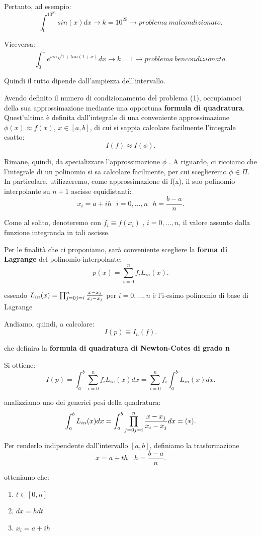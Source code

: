 \documentclass[11pt]{article}
\theoremstyle{definition}
\theoremstyle{plain}
\begin{document}
Pertanto, ad esempio:
\[
	\int_{0}^{10^{25}}sin(x)dx \to k=10^{25}\to problema\ malcondizionato
.\] 

Viceversa:
\[
	\int_{0}^{1}e^{sin\sqrt{1+tan(1+x)} }dx \to k=1\to problema\ bencondizionato
.\] 

Quindi il tutto dipende dall'ampiezza dell'intervallo.

Avendo definito il numero di condizionamento del problema (1), occupiamoci della sua approssimazione mediante una opportuna \textbf{formula di quadratura}.
Quest'ultima è definita dall'integrale di una conveniente approssimazione $\phi(x) \approx f(x)$, $x\in[a,b]$, di cui si sappia calcolare facilmente l'integrale esatto:
\[
	I(f)\approx I(\phi)
.\] 

Rimane, quindi, da specializzare l'approssimazione $\phi$ . A riguardo, ci ricoiamo che l'integrale di un polinomio si sa calcolare facilmente, per cui sceglieremo $\phi \in \Pi$. In particolare, utilizzeremo, come approssimazione di f(x), il suo polinomio interpolante su $n+1$ ascisse equidistanti:
\[
x_{i}=a+ih\ \ \ i=0,...,n\ \ \ h=\frac{b-a}{n}
.\] 

Come al solito, denoteremo con $f_{i}\equiv f(x_{i})$ , $i=0,...,n$, il valore assunto dalla funzione integranda in tali ascisse.

Per le finalità che ci proponiamo, sarà conveniente scegliere la \textbf{forma di Lagrange} del polinomio interpolante:
\[
	p(x)=\sum_{i=0}^{n} f_{i}L_{in}(x)
.\] 

essendo $L_{in}(x)=\prod_{j=0\\ j = i}^{n} \frac{x-x_{j}}{x_{i}-x_{j}}$ per $i=0,...,n$ è l'i-esimo polinomio di base di Lagrange

Andiamo, quindi, a calcolare:
\[
	I(p)\equiv I_n(f)
.\] 

che definira la \textbf{formula di quadratura di Newton-Cotes di grado n}

Si ottiene:
\[
	I(p)=\int_{a}^{b}\sum_{i=0}^{n} f_{i}L_{in}(x)dx=\sum_{i=0}^{n} f_{i}\int_{a}^{b}L_{in}(x)dx
.\] 

analizziamo uno dei generici pesi della quadratura:
\[
	\int_{a}^{b}L_{in}(x)dx=\int_{a}^{b}\prod_{j=0\\ j = i}^{n} \frac{x-x_{j}}{x_{i}-x_{j}}dx=(*)
.\] 

Per renderlo indipendente dall'intervallo $[a,b]$, definiamo la trasformazione
\[
x=a+th \ \ \ \ h=\frac{b-a}{n}
.\] 

otteniamo che:
\begin{enumerate}
	\item $t\in [0,n]$ 
	\item $dx=hdt$ 
	\item $x_{i}=a+ih$ 
\end{enumerate}
\end{document}

